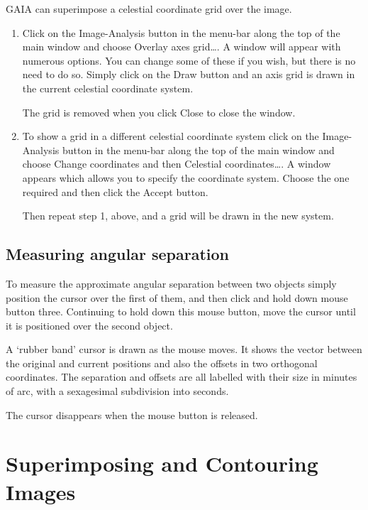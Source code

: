 \documentclass[twoside,11pt]{article}
\newcommand{\xlabel}[1]{}
\renewcommand{\_}{\texttt{\symbol{95}}}
\begin{document}
GAIA can superimpose a celestial coordinate grid over the image.

\begin{enumerate}

  \item Click on the {\sf Image-Analysis} button in the menu-bar along
   the top    of the main window and choose {\sf Overlay axes grid\ldots}.
   A window will appear with numerous options.  You can change some of
   these if you wish, but there is no need to do so.  Simply click on the
   {\sf Draw} button and an axis grid is drawn in the current celestial
   coordinate system.

   The grid is removed when you click {\sf Close} to close the window.

  \item To show a grid in a different celestial coordinate system click
   on the {\sf Image-Analysis} button in the menu-bar along the top
   of the main window and choose {\sf Change coordinates} and then
   {\sf Celestial coordinates\ldots}.  A window appears which allows you
   to specify the coordinate system.  Choose the one required and then
   click the {\sf Accept} button.

   Then repeat step 1, above, and a grid will be drawn in the new system.

\end{enumerate}

\subsection{Measuring angular separation}

To measure the approximate angular separation between two objects simply
position the cursor over the first of them, and then click and hold down
mouse button three.  Continuing to hold down this mouse button, move the
cursor until it is positioned over the second object.

A `rubber band' cursor is drawn as the mouse moves.  It shows the vector
between the original and current positions and also the offsets in two
orthogonal coordinates.  The separation and offsets are all labelled with
their size in minutes of arc, with a sexagesimal subdivision into seconds.

The cursor disappears when the mouse button is released.


\newpage
\section{\xlabel{SUPER_RECIP}\label{SUPER_RECIP}Superimposing and
Contouring Images}
\end{document}
